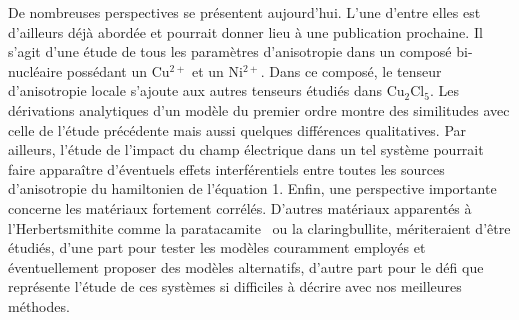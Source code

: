 \documentclass[12pt,a4paper]{report}
\numberwithin{equation}{section}
\begin{document}
De nombreuses perspectives se présentent aujourd’hui. L’une d’entre elles est d’ailleurs déjà abordée et pourrait donner lieu à une publication prochaine. Il s’agit d’une étude de tous les paramètres d’anisotropie dans un composé bi-nucléaire possédant un Cu$^{2+}$ et un Ni$^{2+}$. Dans ce composé, le tenseur d’anisotropie locale s’ajoute aux autres tenseurs étudiés dans Cu$_2$Cl$_5$. Les dérivations analytiques d’un modèle du premier ordre montre des similitudes avec celle de l’étude précédente mais aussi quelques différences qualitatives. Par ailleurs, l’étude de l’impact du champ électrique dans un tel système pourrait faire apparaître d’éventuels effets interférentiels entre toutes les sources d’anisotropie du hamiltonien de l’équation 1. 
Enfin, une perspective importante concerne les matériaux fortement corrélés. D’autres matériaux apparentés à l’Herbertsmithite comme la paratacamite~\cite{mendels_quantum_2007} ou la claringbullite,\cite{feng_claringbullite_2018} mériteraient d’être étudiés, d’une part pour tester les modèles couramment employés et éventuellement proposer des modèles alternatifs, d’autre part pour le défi que représente l’étude de ces systèmes si difficiles à décrire avec nos meilleures méthodes. 
\end{document}
